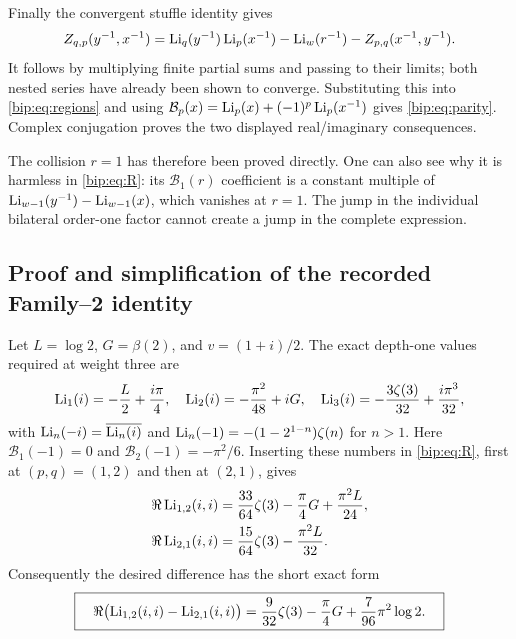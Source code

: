 Finally the convergent stuffle identity gives
\[
 Z_{q,p}(y^{-1},x^{-1})=
 \operatorname{Li}_q(y^{-1})\operatorname{Li}_p(x^{-1})-\operatorname{Li}_w(r^{-1})
 -Z_{p,q}(x^{-1},y^{-1}).
\]
It follows by multiplying finite partial sums and passing to their
limits; both nested series have already been shown to converge.
Substituting this into \eqref{bip:eq:regions} and using
$\mathcal B_p(x)=\operatorname{Li}_p(x)+(-1)^p\operatorname{Li}_p(x^{-1})$ gives
\eqref{bip:eq:parity}.  Complex conjugation proves the two displayed
real/imaginary consequences.

The collision $r=1$ has therefore been proved directly. One can also
see why it is harmless in \eqref{bip:eq:R}: its $\mathcal B_1(r)$
coefficient is a constant multiple of
$\operatorname{Li}_{w-1}(y^{-1})-\operatorname{Li}_{w-1}(x)$, which vanishes at $r=1$.
The jump in the individual bilateral order-one factor cannot create
a jump in the complete expression.

\subsection{Proof and simplification of the recorded Family--2 identity}
Let $L=\log2$, $G=\beta(2)$, and $v=(1+i)/2$. The exact depth-one
values required at weight three are
\[
 \operatorname{Li}_1(i)=-\frac L2+\frac{i\pi}4,\quad
 \operatorname{Li}_2(i)=-\frac{\pi^2}{48}+iG,\quad
 \operatorname{Li}_3(i)=-\frac{3\zeta(3)}{32}+\frac{i\pi^3}{32},
\]
with $\operatorname{Li}_n(-i)=\overline{\operatorname{Li}_n(i)}$ and
$\operatorname{Li}_n(-1)=-(1-2^{1-n})\zeta(n)$ for $n>1$.
Here $\mathcal B_1(-1)=0$ and
$\mathcal B_2(-1)=-\pi^2/6$. Inserting these numbers in
\eqref{bip:eq:R}, first at $(p,q)=(1,2)$ and then at $(2,1)$,
gives
\begin{align}
 \Re\operatorname{Li}_{1,2}(i,i)
   &=\frac{33}{64}\zeta(3)-\frac\pi4G+\frac{\pi^2L}{24},
       \label{bip:eq:12}\\
 \Re\operatorname{Li}_{2,1}(i,i)
   &=\frac{15}{64}\zeta(3)-\frac{\pi^2L}{32}.
       \label{bip:eq:21}
\end{align}
Consequently the desired difference has the short exact form
\begin{equation}
 \boxed{\quad
 \Re\bigl(\operatorname{Li}_{1,2}(i,i)-\operatorname{Li}_{2,1}(i,i)\bigr)
 =\frac9{32}\zeta(3)-\frac\pi4G+\frac7{96}\pi^2\log2.
 \quad}
 \label{bip:eq:family2-short}
\end{equation}

